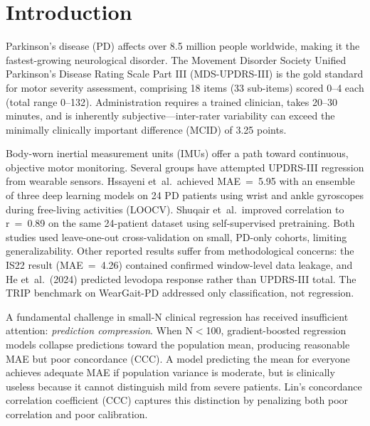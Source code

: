 \documentclass[11pt]{article}
\begin{document}
\section{Introduction}

Parkinson's disease (PD) affects over 8.5 million people worldwide, making it the fastest-growing neurological disorder\cite{gbd2019}. The Movement Disorder Society Unified Parkinson's Disease Rating Scale Part III (MDS-UPDRS-III) is the gold standard for motor severity assessment, comprising 18 items (33 sub-items) scored 0--4 each (total range 0--132). Administration requires a trained clinician, takes 20--30 minutes, and is inherently subjective---inter-rater variability can exceed the minimally clinically important difference (MCID) of 3.25 points\cite{horvath2015}.

Body-worn inertial measurement units (IMUs) offer a path toward continuous, objective motor monitoring. Several groups have attempted UPDRS-III regression from wearable sensors. Hssayeni et~al.\ achieved MAE~=~5.95 with an ensemble of three deep learning models on 24 PD patients using wrist and ankle gyroscopes during free-living activities (LOOCV)\cite{hssayeni2021}. Shuqair et~al.\ improved correlation to r~=~0.89 on the same 24-patient dataset using self-supervised pretraining\cite{shuqair2024}. Both studies used leave-one-out cross-validation on small, PD-only cohorts, limiting generalizability. Other reported results suffer from methodological concerns: the IS22 result (MAE~=~4.26) contained confirmed window-level data leakage\cite{sotirakis2023}, and He et~al.\ (2024) predicted levodopa response rather than UPDRS-III total\cite{he2024}. The TRIP benchmark on WearGait-PD addressed only classification, not regression\cite{trip2025}.

A fundamental challenge in small-N clinical regression has received insufficient attention: \emph{prediction compression}. When N$<$100, gradient-boosted regression models collapse predictions toward the population mean, producing reasonable MAE but poor concordance (CCC). A model predicting the mean for everyone achieves adequate MAE if population variance is moderate, but is clinically useless because it cannot distinguish mild from severe patients. Lin's concordance correlation coefficient (CCC)\cite{lin1989} captures this distinction by penalizing both poor correlation and poor calibration.
\end{document}
